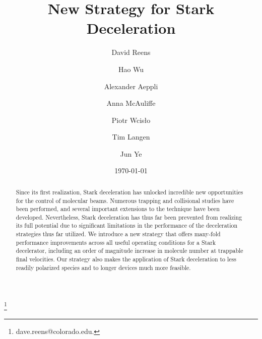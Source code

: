 \documentclass[%
 reprint,
 amsmath,amssymb,
 aps,
prl,
]{revtex4-1}
\begin{document}
\title{New Strategy for Stark Deceleration}%

\author{David Reens}
\thanks{dave.reens@colorado.edu.}

\author{Hao Wu}
\author{Alexander Aeppli}
\author{Anna McAuliffe}
\author{Piotr Wcis\l o}
\author{Tim Langen}%

\author{Jun Ye}


\date{\today}



\begin{abstract}
Since its first realization, Stark deceleration has unlocked incredible new opportunities for the control of molecular beams. 
Numerous trapping and collisional studies have been performed, and several important extensions to the technique have been developed. 
Nevertheless, Stark deceleration has thus far been prevented from realizing its full potential due to significant limitations in the performance of the deceleration strategies thus far utilized.
We introduce a new strategy that offers many-fold performance improvements across all useful operating conditions for a Stark decelerator, including an order of magnitude increase in molecule number at trappable final velocities.
Our strategy also makes the application of Stark deceleration to less readily polarized species and to longer devices much more feasible.
\end{abstract}

\maketitle
\end{document}
